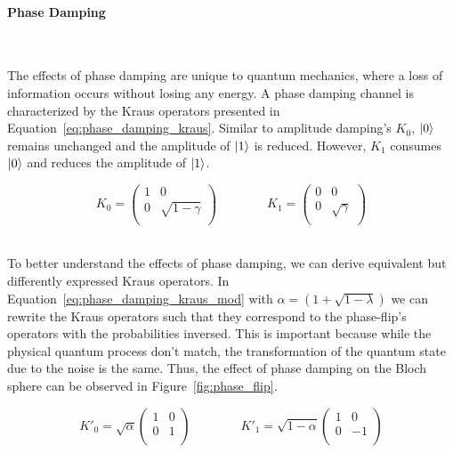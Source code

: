 \paragraph{Phase Damping} \

The effects of phase damping are unique to quantum mechanics, where
a loss of information occurs without losing any energy. A phase
damping channel is characterized by the Kraus operators presented
in Equation~\ref{eq:phase_damping_kraus}. Similar to amplitude
damping's \(K_0\), \(\ket{0}\) remains unchanged and the amplitude
of \(\ket{1}\) is reduced. However, \(K_1\) consumes \(\ket{0}\)
and reduces the amplitude of \(\ket{1}\). \

\begin{equation}\label{eq:phase_damping_kraus}
  K_0 = \begin{pmatrix}
          1 & 0 \\
          0 & \sqrt{1-\gamma} \\
        \end{pmatrix} \qquad \qquad
  K_1 = \begin{pmatrix}
          0 & 0 \\
          0 & \sqrt{\gamma} \\
        \end{pmatrix}
\end{equation} \

To better understand the effects of phase damping, we can derive equivalent but
differently expressed Kraus operators. In Equation~\ref{eq:phase_damping_kraus_mod}
with \(\alpha = \left(1 + \sqrt{1 - \lambda}\right)\) we can rewrite the
Kraus operators such that they correspond to the phase-flip's operators with
the probabilities inversed. This is important because while the physical
quantum process don't match, the transformation of the quantum state due to
the noise is the same. Thus, the effect of phase damping on the Bloch sphere
can be observed in Figure~\ref{fig:phase_flip}. \

\begin{equation}\label{eq:phase_damping_kraus_mod}
  K'_0 = \sqrt{\alpha} \begin{pmatrix}
    1 & 0 \\
    0 & 1 \\
  \end{pmatrix} \qquad \qquad
  K'_1 = \sqrt{1-\alpha} \begin{pmatrix}
    1 & 0 \\
    0 & -1 \\
  \end{pmatrix}
\end{equation} \


